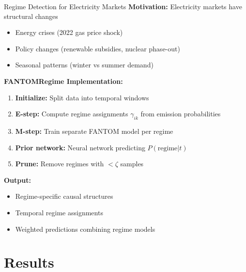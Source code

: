 \documentclass[aspectratio=169]{beamer}
\begin{document}
\begin{frame}{Regime Detection for Electricity Markets}
\textbf{Motivation:} Electricity markets have structural changes
\begin{itemize}
    \item Energy crises (2022 gas price shock)
    \item Policy changes (renewable subsidies, nuclear phase-out)
    \item Seasonal patterns (winter vs summer demand)
\end{itemize}

\vspace{0.3cm}
\textbf{FANTOMRegime Implementation:}
\begin{enumerate}
    \item \textbf{Initialize:} Split data into temporal windows
    \item \textbf{E-step:} Compute regime assignments $\gamma_{ik}$ from emission probabilities
    \item \textbf{M-step:} Train separate FANTOM model per regime
    \item \textbf{Prior network:} Neural network predicting $P(\text{regime} | t)$
    \item \textbf{Prune:} Remove regimes with $< \zeta$ samples
\end{enumerate}

\vspace{0.3cm}
\textbf{Output:}
\begin{itemize}
    \item Regime-specific causal structures
    \item Temporal regime assignments
    \item Weighted predictions combining regime models
\end{itemize}
\end{frame}

\section{Results}
\end{document}
